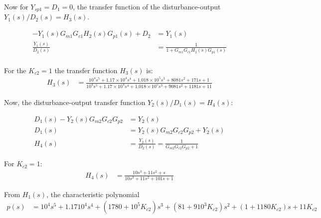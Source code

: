 \documentclass[a4paper]{article}
\begin{document}
Now for $Y_{sp1}=D_{1}=0$, the transfer function of the disturbance-output $Y_1(s)/D_2(s)=H_3(s)$.

\begin{align*}
-Y_1(s)G_{m1}G_{c1}H_2(s)G_{p1}(s)+D_2 &= Y_1(s)\\
\frac{Y_1(s)}{D_2(s)}&=\frac{1}{1+G_{m1}G_{c1}H_2(s)G_{p1}(s)}\\
\end{align*}

For the $K_{c2}=1$ the transfer function $H_3(s)$ is:
\begin{align}
H_3(s)&=\frac{10^4 s^5 + 1.17\times10^4 s^4 + 1.018\times10^5 s^3 + 8081 s^2 + 171 s + 1}{10^4s^5 + 1.17\times10^4s^4 + 1.018\times10^5 s^3 + 9081 s^2 + 1181 s + 11}
\end{align}

Now, the disturbance-output transfer function $Y_2(s)/D_1(s)=H_4(s)$:

\begin{align*}
D_1(s)-Y_2(s)G_{m2}G_{c2}G_{p2}&=Y_2(s)\\
D_1(s)&=Y_2(s)G_{m2}G_{c2}G_{p2}+Y_2(s)\\
H_4(s)&=\frac{Y_2(s)}{D_2(s)}=\frac{1}{G_{m2}G_{c2}G_{p2}+1}
\end{align*}

For $K_{c2}=1$:
\begin{align}
H_4(s)&=\frac{10 s^3 + 11 s^2 + s}{10 s^3 + 11 s^2 + 101 s + 1}
\end{align}

From $H_1(s)$, the characteristic polynomial 
\begin{align*}
p(s) &= 10^4s^5+1.1710^4s^4+(1780+10^5K_{c2})s^3+(81+910^3K_{c2})s^2+(1+1180K_{c2})s+11K_{c2}
\end{align*}
\end{document}
